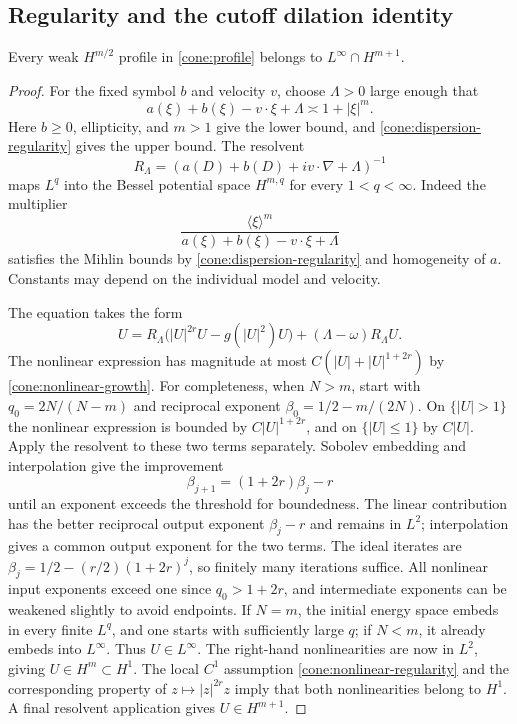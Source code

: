 \subsection{Regularity and the cutoff dilation identity}

\begin{lemma}\label{cone:regularity}
Every weak \(H^{m/2}\) profile in \eqref{cone:profile} belongs to
\(L^\infty\cap H^{m+1}\).
\end{lemma}
\begin{proof}
For the fixed symbol \(b\) and velocity \(v\), choose \(\Lambda>0\)
large enough that
\[
a(\xi)+b(\xi)-v\cdot\xi+\Lambda\asymp1+|\xi|^m.
\]
Here \(b\ge0\), ellipticity, and \(m>1\) give the lower bound,
and \eqref{cone:dispersion-regularity} gives the upper bound.
The resolvent
\[
R_\Lambda=(a(D)+b(D)+iv\cdot\nabla+\Lambda)^{-1}
\]
maps \(L^q\) into the Bessel potential space \(H^{m,q}\) for every
\(1<q<\infty\). Indeed the multiplier
\[
\frac{\langle\xi\rangle^m}
{a(\xi)+b(\xi)-v\cdot\xi+\Lambda}
\]
satisfies the Mihlin bounds by
\eqref{cone:dispersion-regularity} and homogeneity of \(a\).
Constants may depend on the individual model and velocity.

The equation takes the form
\[
U=R_\Lambda\bigl(|U|^{2r}U-g(|U|^2)U\bigr)
+(\Lambda-\omega)R_\Lambda U.
\]
The nonlinear expression has magnitude at most
\(C(|U|+|U|^{1+2r})\) by \eqref{cone:nonlinear-growth}.
For completeness, when \(N>m\), start with
\(q_0=2N/(N-m)\) and reciprocal exponent
\(\beta_0=1/2-m/(2N)\). On \(\{|U|>1\}\) the nonlinear
expression is bounded by \(C|U|^{1+2r}\), and on
\(\{|U|\le1\}\) by \(C|U|\). Apply the resolvent to these
two terms separately. Sobolev embedding and interpolation give
the improvement
\[
\beta_{j+1}=(1+2r)\beta_j-r
\]
until an exponent exceeds the threshold for boundedness. The
linear contribution has the better reciprocal output exponent
\(\beta_j-r\) and remains in \(L^2\); interpolation gives a common
output exponent for the two terms. The ideal iterates are
\(\beta_j=1/2-(r/2)(1+2r)^j\), so finitely many iterations
suffice. All nonlinear input exponents exceed one since
\(q_0>1+2r\), and intermediate exponents can be weakened slightly
to avoid endpoints. If \(N=m\), the initial energy space embeds
in every finite \(L^q\), and one starts with sufficiently large
\(q\); if \(N<m\), it already embeds into \(L^\infty\).
Thus \(U\in L^\infty\). The right-hand nonlinearities are now in
\(L^2\), giving \(U\in H^m\subset H^1\). The local \(C^1\)
assumption \eqref{cone:nonlinear-regularity} and the corresponding
property of \(z\mapsto|z|^{2r}z\) imply that both nonlinearities
belong to \(H^1\). A final resolvent application gives
\(U\in H^{m+1}\).
\end{proof}

